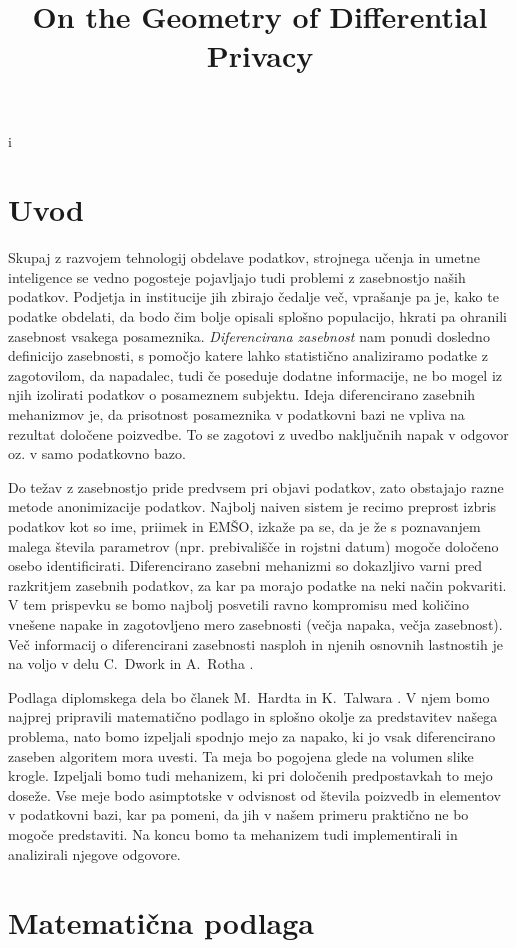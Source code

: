 i\documentclass[mat1]{fmfdelo}
\title{On the Geometry of Differential Privacy}
\begin{document}
\section{Uvod}

Skupaj z razvojem tehnologij obdelave podatkov, strojnega učenja in umetne inteligence se vedno pogosteje pojavljajo tudi problemi z zasebnostjo naših podatkov. Podjetja in institucije jih zbirajo čedalje več, vprašanje pa je, kako te podatke obdelati, da bodo čim bolje opisali splošno populacijo, hkrati pa ohranili zasebnost vsakega posameznika. \emph{Diferencirana zasebnost} nam ponudi dosledno definicijo zasebnosti, s pomočjo katere lahko statistično analiziramo podatke z zagotovilom, da napadalec, tudi če poseduje dodatne informacije, ne bo mogel iz njih izolirati podatkov o posameznem subjektu. Ideja diferencirano zasebnih mehanizmov je, da prisotnost posameznika v podatkovni bazi ne vpliva na rezultat določene poizvedbe. To se zagotovi z uvedbo naključnih napak v odgovor oz. v samo podatkovno bazo.

Do težav z zasebnostjo pride predvsem pri objavi podatkov, zato obstajajo razne metode anonimizacije podatkov. Najbolj naiven sistem je recimo preprost izbris podatkov kot so ime, priimek in EMŠO, izkaže pa se, da je že s poznavanjem malega števila parametrov (npr. prebivališče in rojstni datum) mogoče določeno osebo identificirati. Diferencirano zasebni mehanizmi so dokazljivo varni pred razkritjem zasebnih podatkov, za kar pa morajo podatke na neki način pokvariti. V tem prispevku se bomo najbolj posvetili ravno kompromisu med količino vnešene napake in zagotovljeno mero zasebnosti (večja napaka, večja zasebnost). Več informacij o diferencirani zasebnosti nasploh in njenih osnovnih lastnostih je na voljo v delu C.~Dwork in A.~Rotha \cite{privacybook}.

Podlaga diplomskega dela bo članek M.~Hardta in K.~Talwara \cite{on-geometry}. V njem bomo najprej pripravili matematično podlago in splošno okolje za predstavitev našega problema, nato bomo izpeljali spodnjo mejo za napako, ki jo vsak diferencirano zaseben algoritem mora uvesti. Ta meja bo pogojena glede na volumen slike krogle. Izpeljali bomo tudi mehanizem, ki pri določenih predpostavkah to mejo doseže. Vse meje bodo asimptotske v odvisnost od števila poizvedb in elementov v podatkovni bazi, kar pa pomeni, da jih v našem primeru praktično ne bo mogoče predstaviti. Na koncu bomo ta mehanizem tudi implementirali in analizirali njegove odgovore.

\section{\texorpdfstring{Matematična podlaga}{Matematicna podlaga}}
\end{document}
